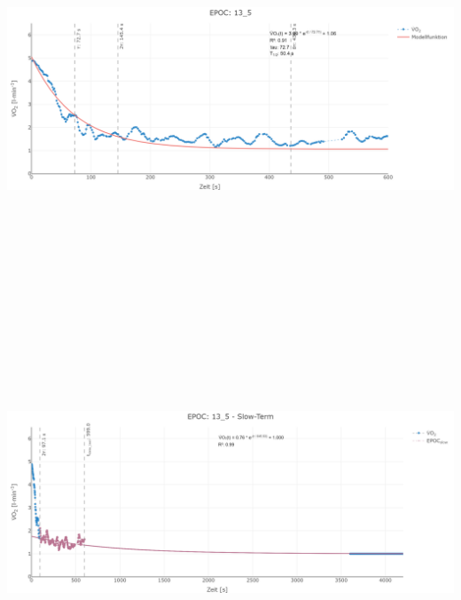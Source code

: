\documentclass[
  letterpaper,
  DIV=11]{scrartcl}
\begin{document}
\includegraphics[width=11.45833in,height=4.6875in]{images/13_5_tau.png}
\includegraphics[width=11.45833in,height=4.6875in]{images/13_5_slow.png}
\end{document}
